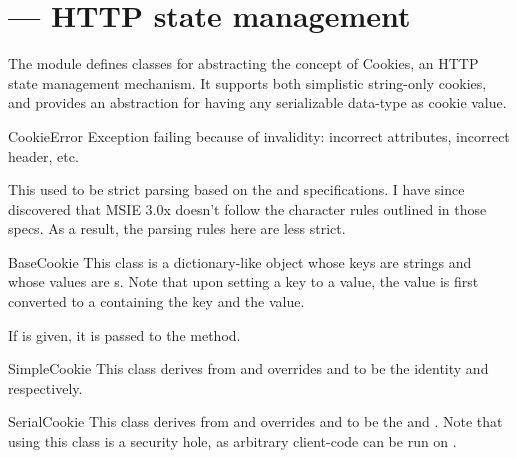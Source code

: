 \section{ ---
         HTTP state management}



The  module defines classes for abstracting the concept of 
Cookies, an HTTP state management mechanism. It supports both simplistic
string-only cookies, and provides an abstraction for having any serializable
data-type as cookie value.


\begin{excdesc}{CookieError}
Exception failing because of  invalidity: incorrect
attributes, incorrect  header, etc.
\end{excdesc}


This used to be strict parsing based on the  and 
specifications.  I have since discovered that MSIE 3.0x doesn't
follow the character rules outlined in those specs.  As a
result, the parsing rules here are less strict.

\begin{classdesc}{BaseCookie}{}
This class is a dictionary-like object whose keys are strings and
whose values are s. Note that upon setting a key to
a value, the value is first converted to a  containing
the key and the value.

If  is given, it is passed to the  method.
\end{classdesc}

\begin{classdesc}{SimpleCookie}{}
This class derives from  and overrides 
and  to be the identity and  respectively.
\end{classdesc}

\begin{classdesc}{SerialCookie}{}
This class derives from  and overrides 
and  to be the  and 
. Note that using this class is a security hole,
as arbitrary client-code can be run on .
\end{classdesc}

